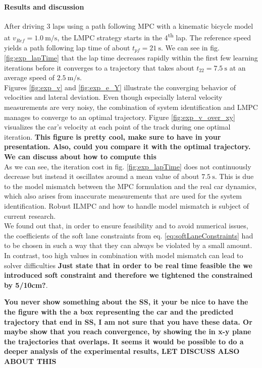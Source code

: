 \paragraph{Results and discussion}
After driving 3 laps using a path following MPC with a kinematic bicycle model at $v_{Ref}=\SI{1.0}{\meter\per\second}$, the LMPC strategy starts in the 4\textsuperscript{th} lap. The reference speed yields a path following lap time of about $t_{pf}=\SI{21}{\second}$. We can see in fig. \ref{fig:exp_lapTime} that the lap time decreases rapidly within the first few learning iterations before it converges to a trajectory that takes about $t_{22}=\SI{7.5}{\second}$ at an average speed of $\SI{2.5}{\meter\per\second}$.\\
Figures \ref{fig:exp_v} and \ref{fig:exp_e_Y} illustrate the converging behavior of velocities and lateral deviation. Even though especially lateral velocity measurements are very noisy, the combination of system identification and LMPC manages to converge to an optimal trajectory.
Figure \ref{fig:exp_v_over_xy} visualizes the car's velocity at each point of the track during one optimal iteration. {\bfseries{This figure is pretty cool, make sure to have in your presentation. Also, could you compare it with the optimal trajectory. We can discuss about how to compute this}} \\
As we can see, the iteration cost in fig. \ref{fig:exp_lapTime} does not continuously decrease but instead it oscillates around a mean value of about $\SI{7.5}{\second}$. This is due to the model mismatch between the MPC formulation and the real car dynamics, which also arises from inaccurate measurements that are used for the system identification. Robust ILMPC and how to handle model mismatch is subject of current research.\\
We found out that, in order to ensure feasibility and to avoid numerical issues, the coefficients of the soft lane constraints from eq. \ref{eq:softLaneConstraints} had to be chosen in such a way that they can always be violated by a small amount. In contrast, too high values in combination with model mismatch can lead to solver difficulties {\bfseries{Just state that in order to be real time feasible the we introduced soft constraint and therefore we tightened the constrained by 5/10cm?}}.

{\bfseries{You never show something about the SS, it your be nice to have the the figure with the a box representing the car and the predicted trajectory that end in SS, I am not sure that you have these data. Or maybe show that you reach convergence, by showing the in x-y plane the trajectories that overlaps. It seems it would be possible to do a deeper analysis of the experimental results, LET DISCUSS ALSO ABOUT THIS}}


